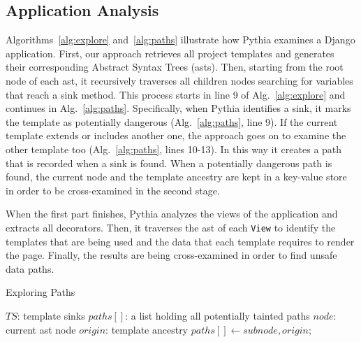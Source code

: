 \subsection{Application Analysis}
\label{sec:analysis}

Algorithms~\ref{alg:explore}
and~\ref{alg:paths} illustrate
how Pythia examines a Django application.
First,
our approach retrieves all project templates
and generates their corresponding
Abstract Syntax Trees ({\sc ast}s).
Then,
starting from the root node of each {\sc ast},
it recursively traverses all children
nodes searching for variables that
reach a sink method.
This process starts in line 9
of Alg.~\ref{alg:explore} and continues
in Alg.~\ref{alg:paths}.
Specifically,
when Pythia identifies a sink,
it marks the template as potentially
dangerous (Alg.~\ref{alg:paths}, line 9).
If the current template extends or
includes another one,
the approach goes on to examine
the other template too
(Alg.~\ref{alg:paths}, lines 10-13).
In this way it creates a path that
is recorded when a sink is found.
When a potentially dangerous path is found, the current node 
and the template ancestry are kept in a key-value store in 
order to be cross-examined in the second stage.

When the first part finishes,
Pythia analyzes the views of the application
and extracts all decorators.
Then,
it traverses the {\sc ast} of each {\tt View}
to identify the templates that are being used
and the data that each template requires 
to render the page.
Finally,
the results are 
being cross-examined in order to find
unsafe data paths.

\begin{algorithm}[ht]
\caption{Exploring Paths}
\label{alg:paths}
\begin{algorithmic}[1]
 $TS$: template sinks
 $paths[]$: a list holding all
potentially tainted paths
 $node$: current {\sc ast} node
 $origin$: template ancestry
            \State $paths[] \gets subnode, origin;$
        \EndIf
\EndIf
\EndFor
\EndFunction
\end{algorithmic}
\end{algorithm}

